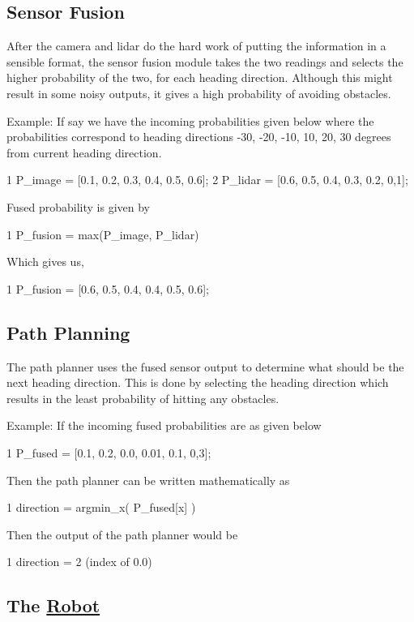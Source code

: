 \subsection*{Sensor Fusion}

After the camera and lidar do the hard work of putting the information in a sensible format, the sensor fusion module takes the two readings and selects the higher probability of the two, for each heading direction. Although this might result in some noisy outputs, it gives a high probability of avoiding obstacles.

Example\+: If say we have the incoming probabilities given below where the probabilities correspond to heading directions -\/30, -\/20, -\/10, 10, 20, 30 degrees from current heading direction. 
\begin{DoxyCode}
1 P\_image = [0.1, 0.2, 0.3, 0.4, 0.5, 0.6];
2 P\_lidar = [0.6, 0.5, 0.4, 0.3, 0.2, 0,1];
\end{DoxyCode}
 Fused probability is given by 
\begin{DoxyCode}
1 P\_fusion = max(P\_image, P\_lidar)
\end{DoxyCode}
 Which gives us, 
\begin{DoxyCode}
1 P\_fusion = [0.6, 0.5, 0.4, 0.4, 0.5, 0.6];
\end{DoxyCode}


\subsection*{Path Planning}

The path planner uses the fused sensor output to determine what should be the next heading direction. This is done by selecting the heading direction which results in the least probability of hitting any obstacles.

Example\+: If the incoming fused probabilities are as given below 
\begin{DoxyCode}
1 P\_fused = [0.1, 0.2, 0.0, 0.01, 0.1, 0,3];
\end{DoxyCode}
 Then the path planner can be written mathematically as 
\begin{DoxyCode}
1 direction = argmin\_x( P\_fused[x] )
\end{DoxyCode}
 Then the output of the path planner would be 
\begin{DoxyCode}
1 direction = 2 (index of 0.0)
\end{DoxyCode}


\subsection*{The \hyperlink{class_robot}{Robot}}

